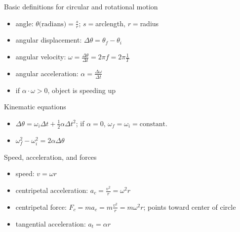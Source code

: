 \documentclass[11pt,letterpaper]{article}
\begin{document}
\noindent Basic definitions for circular and rotational motion
\begin{itemize}
\item angle: $\theta\mbox{(radians)}=\displaystyle\frac{s}{r}$; $s=$arclength, $r=$radius
\item angular displacement: $\Delta\theta=\theta_f-\theta_i$
\item angular velocity: $\omega=\displaystyle\frac{\Delta\theta}{\Delta{t}}=2\pi{f}=2\pi\displaystyle\frac{1}{T}$
\item angular acceleration: $\alpha=\displaystyle\frac{\Delta\omega}{\Delta{t}}$
\item if $\alpha \cdot \omega > 0$, object is speeding up
\end{itemize}
\noindent Kinematic equations
\begin{itemize}
\item $\Delta\theta=\omega_i\Delta{t}+\displaystyle\frac{1}{2}\alpha\Delta{t}^2$; if $\alpha=0$, $\omega_f=\omega_i=\mbox{constant}$.
\item $\omega_f^2-\omega_i^2=2\alpha\Delta{\theta}$
\end{itemize}
\noindent Speed, acceleration, and forces
\begin{itemize}
\item speed: $v=\omega{r}$
\item centripetal acceleration: $a_c=\displaystyle\frac{v^2}{r}=\omega^2r$
\item centripetal force: $F_c=ma_c=m\displaystyle\frac{v^2}{r}=m\omega^2r$; points toward center of circle
\item tangential acceleration: $a_t=\alpha{r}$
\end{itemize}
\end{document}

